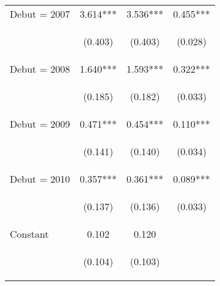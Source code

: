 \begin{center}
\begin{tabular}{lccc}
Debut = 2007 & 3.614*** & 3.536*** & 0.455*** \\
\vspace{4pt} & \begin{footnotesize}(0.403)\end{footnotesize} & \begin{footnotesize}(0.403)\end{footnotesize} & \begin{footnotesize}(0.028)\end{footnotesize} \\
Debut = 2008 & 1.640*** & 1.593*** & 0.322*** \\
\vspace{4pt} & \begin{footnotesize}(0.185)\end{footnotesize} & \begin{footnotesize}(0.182)\end{footnotesize} & \begin{footnotesize}(0.033)\end{footnotesize} \\
Debut = 2009 & 0.471*** & 0.454*** & 0.110*** \\
\vspace{4pt} & \begin{footnotesize}(0.141)\end{footnotesize} & \begin{footnotesize}(0.140)\end{footnotesize} & \begin{footnotesize}(0.034)\end{footnotesize} \\
Debut = 2010 & 0.357*** & 0.361*** & 0.089*** \\
\vspace{4pt} & \begin{footnotesize}(0.137)\end{footnotesize} & \begin{footnotesize}(0.136)\end{footnotesize} & \begin{footnotesize}(0.033)\end{footnotesize} \\
Constant & 0.102 & 0.120 &  \\
 & \begin{footnotesize}(0.104)\end{footnotesize} & \begin{footnotesize}(0.103)\end{footnotesize} & \begin{footnotesize}\end{footnotesize} \\

\end{tabular}
\end{center}
